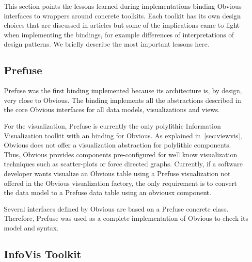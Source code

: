 This section points the lessons learned during implementations binding
Obvious interfaces to wrappers around concrete toolkits.  Each toolkit
has its own design choices that are discussed in articles but some of
the implications came to light when implementing the bindings, for
example differences of interpretations of design patterns.  We briefly
describe the most important lessons here.

\subsection{Prefuse}

Prefuse was the first binding implemented because its architecture is,
by design, very close to Obvious.  The binding implements all the
abstractions described in the core Obvious interfaces for all data
models, visualizations and views.

For the visualization, Prefuse is currently the only polylithic
Information Visualization toolkit with an binding for Obvious.  As
explained in~\ref{sec:viewvis}, Obvious does not offer a visualization
abstraction for polylithic components.  Thus, Obvious provides
components pre-configured for well know visualization techniques such
as scatter-plots or force directed graphs.  Currently, if a software
developer wants visualize an Obvious table using a Prefuse
visualization not offered in the Obvious visualization factory, the
only requirement is to convert the data model to a Prefuse data table
using an obviousx component.  


Several interfaces defined by Obvious are based on a Prefuse concrete
class.  Therefore, Prefuse was used as a complete implementation of
Obvious to check its model and syntax.


\subsection{InfoVis Toolkit}

